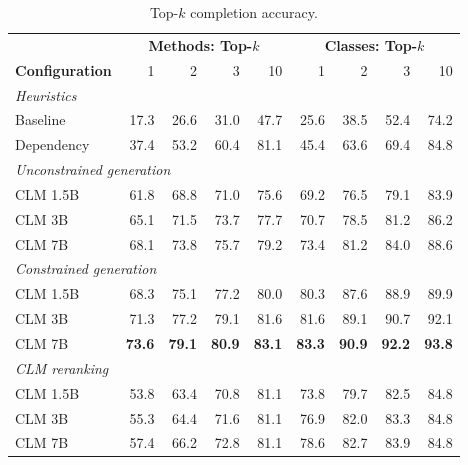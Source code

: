 \begin{table}[t]
\centering
\caption{Top-$k$ completion accuracy.}
\label{tab:top-k-accuracy}
\setlength{\tabcolsep}{2.6pt}
\small
\begin{tabular}{lrrrr@{\hspace{8pt}}rrrr}
\toprule
 & \multicolumn{4}{c}{\textbf{Methods: Top-$k$}} & \multicolumn{4}{c}{\textbf{Classes: Top-$k$}} \\
\textbf{Configuration} & 1 & 2 & 3 & 10 & 1 & 2 & 3 & 10 \\
\midrule
\multicolumn{9}{l}{\textit{Heuristics}} \\
Baseline & 17.3 & 26.6 & 31.0 & 47.7 & 25.6 & 38.5 & 52.4 & 74.2 \\
Dependency & 37.4 & 53.2 & 60.4 & 81.1 & 45.4 & 63.6 & 69.4 & 84.8 \\
\midrule
\multicolumn{9}{l}{\textit{Unconstrained generation}} \\
CLM 1.5B & 61.8 & 68.8 & 71.0 & 75.6 & 69.2 & 76.5 & 79.1 & 83.9 \\
CLM 3B & 65.1 & 71.5 & 73.7 & 77.7 & 70.7 & 78.5 & 81.2 & 86.2 \\
CLM 7B & 68.1 & 73.8 & 75.7 & 79.2 & 73.4 & 81.2 & 84.0 & 88.6 \\
\midrule
\multicolumn{9}{l}{\textit{Constrained generation}} \\
CLM 1.5B & 68.3 & 75.1 & 77.2 & 80.0 & 80.3 & 87.6 & 88.9 & 89.9 \\
CLM 3B & 71.3 & 77.2 & 79.1 & 81.6 & 81.6 & 89.1 & 90.7 & 92.1 \\
CLM 7B & \textbf{73.6} & \textbf{79.1} & \textbf{80.9} & \textbf{83.1} & \textbf{83.3} & \textbf{90.9} & \textbf{92.2} & \textbf{93.8} \\
\midrule
\multicolumn{9}{l}{\textit{CLM reranking}} \\
CLM 1.5B & 53.8 & 63.4 & 70.8 & 81.1 & 73.8 & 79.7 & 82.5 & 84.8 \\
CLM 3B & 55.3 & 64.4 & 71.6 & 81.1 & 76.9 & 82.0 & 83.3 & 84.8 \\
CLM 7B & 57.4 & 66.2 & 72.8 & 81.1 & 78.6 & 82.7 & 83.9 & 84.8 \\
\bottomrule
\end{tabular}
\end{table}
